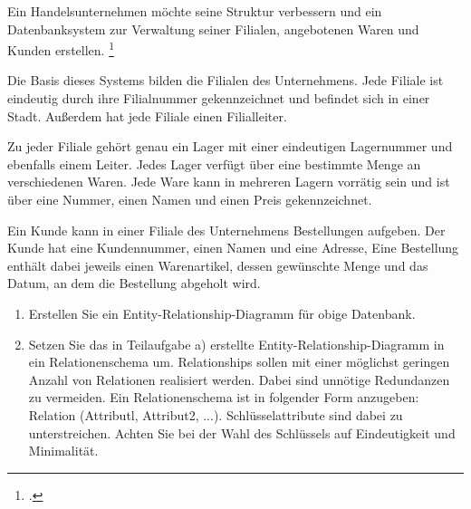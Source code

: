 \documentclass{lehramt-informatik-aufgabe}
\begin{document}

Ein Handelsunternehmen möchte seine Struktur verbessern und ein
Datenbanksystem zur Verwaltung seiner Filialen, angebotenen Waren und
Kunden erstellen.
\footcite{examen:66116:2012:03}

Die Basis dieses Systems bilden die Filialen des Unternehmens. Jede
Filiale ist eindeutig durch ihre Filialnummer gekennzeichnet und
befindet sich in einer Stadt. Außerdem hat jede Filiale einen
Filialleiter.

Zu jeder Filiale gehört genau ein Lager mit einer eindeutigen
Lagernummer und ebenfalls einem Leiter. Jedes Lager verfügt über eine
bestimmte Menge an verschiedenen Waren. Jede Ware kann in mehreren
Lagern vorrätig sein und ist über eine Nummer, einen Namen und einen
Preis gekennzeichnet.

Ein Kunde kann in einer Filiale des Unternehmens Bestellungen aufgeben.
Der Kunde hat eine Kundennummer, einen Namen und eine Adresse, Eine
Bestellung enthält dabei jeweils einen Warenartikel, dessen gewünschte
Menge und das Datum, an dem die Bestellung abgeholt wird.

\begin{enumerate}


\item Erstellen Sie ein Entity-Relationship-Diagramm für obige Datenbank.


\item Setzen Sie das in Teilaufgabe a) erstellte
Entity-Relationship-Diagramm in ein Relationenschema um. Relationships
sollen mit einer möglichst geringen Anzahl von Relationen realisiert
werden. Dabei sind unnötige Redundanzen zu vermeiden. Ein
Relationenschema ist in folgender Form anzugeben: Relation (Attributl,
Attribut2, ...). Schlüsselattribute sind dabei zu unterstreichen. Achten
Sie bei der Wahl des Schlüssels auf Eindeutigkeit und Minimalität.

\end{enumerate}
\end{document}
